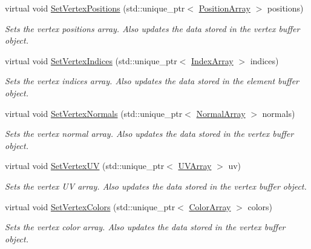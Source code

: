 \begin{DoxyCompactItemize}
virtual void \hyperlink{class_rendering_object_ada51886b7da1924a17d3a55e8fe90061}{Set\+Vertex\+Positions} (std\+::unique\+\_\+ptr$<$ \hyperlink{class_rendering_object_a1223b9cf03f2029b9c43d71042c2a18e}{Position\+Array} $>$ positions)
\begin{DoxyCompactList}\small\item\em Sets the vertex positions array. Also updates the data stored in the vertex buffer object. \end{DoxyCompactList}\item
virtual void \hyperlink{class_rendering_object_a61ea597df0c456834eac8eb4087fb573}{Set\+Vertex\+Indices} (std\+::unique\+\_\+ptr$<$ \hyperlink{class_rendering_object_a9931c88bca3384065c6691dfe1e60af1}{Index\+Array} $>$ indices)
\begin{DoxyCompactList}\small\item\em Sets the vertex indices array. Also updates the data stored in the element buffer object. \end{DoxyCompactList}\item
virtual void \hyperlink{class_rendering_object_a4cd085aed01fbc5e4fae7076e00919d3}{Set\+Vertex\+Normals} (std\+::unique\+\_\+ptr$<$ \hyperlink{class_rendering_object_a327c4d892de8d6138fb59afa6d078257}{Normal\+Array} $>$ normals)
\begin{DoxyCompactList}\small\item\em Sets the vertex normal array. Also updates the data stored in the vertex buffer object. \end{DoxyCompactList}\item
virtual void \hyperlink{class_rendering_object_a2a2b3c6ec2d13e8d3a4b6ac4c05ae11b}{Set\+Vertex\+UV} (std\+::unique\+\_\+ptr$<$ \hyperlink{class_rendering_object_a504ecd45ebe36dfa5b78c46d64d9904a}{U\+V\+Array} $>$ uv)
\begin{DoxyCompactList}\small\item\em Sets the vertex UV array. Also updates the data stored in the vertex buffer object. \end{DoxyCompactList}\item
virtual void \hyperlink{class_rendering_object_aa1170c47ff02b2305a54c8aab3460201}{Set\+Vertex\+Colors} (std\+::unique\+\_\+ptr$<$ \hyperlink{class_rendering_object_a8a12e1f9be788d99af6c089e1c600022}{Color\+Array} $>$ colors)
\begin{DoxyCompactList}\small\item\em Sets the vertex color array. Also updates the data stored in the vertex buffer object. \end{DoxyCompactList}\item

\end{DoxyCompactItemize}
